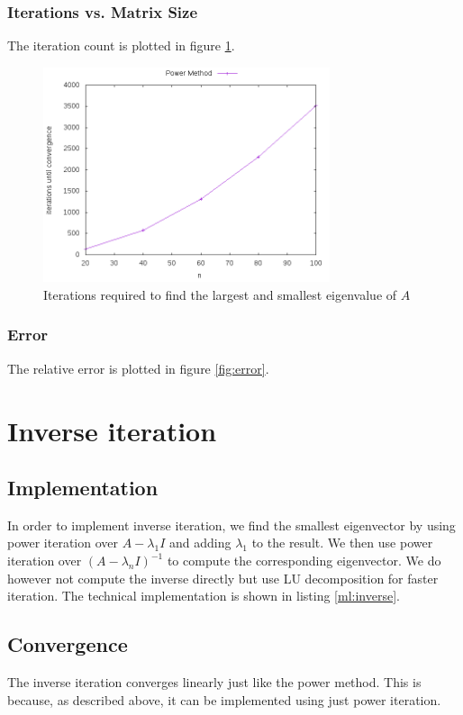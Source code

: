 \subsubsection{Iterations vs. Matrix Size}
The iteration count is plotted in figure \ref{fig:iterations}.
\begin{figure}[h!]
  \centering \includegraphics[width=0.75\textwidth]{plots/iterations_vs_n.png}
  \caption{Iterations required to find the largest and smallest eigenvalue of $A$}
  \label{fig:iterations}
\end{figure}
\subsubsection{Error}
The relative error is plotted in figure \ref{fig:error}.

\section{Inverse iteration}

\subsection{Implementation}
In order to implement inverse iteration,
we find the smallest eigenvector by
using power iteration over $A-\lambda_1 I$ and adding $\lambda_1$ to the result.
We then use power iteration over $(A-\lambda_n I)^{-1}$ to compute the corresponding eigenvector. We do however not compute the
inverse directly but use LU decomposition for faster iteration.
The technical implementation is shown in listing \ref{ml:inverse}.

\subsection{Convergence}
The inverse iteration converges linearly just like the power method. This is because, as described above, it can be implemented using
just power iteration.

